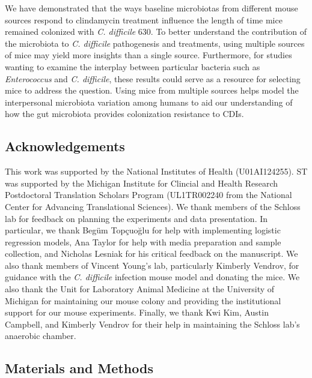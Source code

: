 \documentclass[
  11pt,
]{article}
\begin{document}
We have demonstrated that the ways baseline microbiotas from different
mouse sources respond to clindamycin treatment influence the length of
time mice remained colonized with \emph{C. difficile} 630. To better
understand the contribution of the microbiota to \emph{C. difficile}
pathogenesis and treatments, using multiple sources of mice may yield
more insights than a single source. Furthermore, for studies wanting to
examine the interplay between particular bacteria such as
\emph{Enterococcus} and \emph{C. difficile}, these results could serve
as a resource for selecting mice to address the question. Using mice
from multiple sources helps model the interpersonal microbiota variation
among humans to aid our understanding of how the gut microbiota provides
colonization resistance to CDIs.

\newpage

\hypertarget{acknowledgements}{%
\subsection{Acknowledgements}\label{acknowledgements}}

This work was supported by the National Institutes of Health
(U01AI124255). ST was supported by the Michigan Institute for Clincial
and Health Research Postdoctoral Translation Scholars Program
(UL1TR002240 from the National Center for Advancing Translational
Sciences). We thank members of the Schloss lab for feedback on planning
the experiments and data presentation. In particular, we thank Begüm
Topçuoğlu for help with implementing logistic regression models, Ana
Taylor for help with media preparation and sample collection, and
Nicholas Lesniak for his critical feedback on the manuscript. We also
thank members of Vincent Young's lab, particularly Kimberly Vendrov, for
guidance with the \emph{C. difficile} infection mouse model and donating
the mice. We also thank the Unit for Laboratory Animal Medicine at the
University of Michigan for maintaining our mouse colony and providing
the institutional support for our mouse experiments. Finally, we thank
Kwi Kim, Austin Campbell, and Kimberly Vendrov for their help in
maintaining the Schloss lab's anaerobic chamber.

\newpage

\hypertarget{materials-and-methods}{%
\subsection{Materials and Methods}\label{materials-and-methods}}
\end{document}
